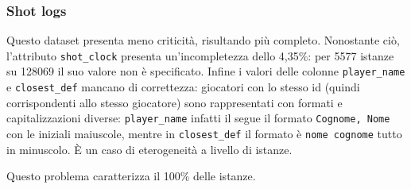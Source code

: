 \subsubsection{Shot logs}

Questo dataset presenta meno criticità, risultando più completo. Nonostante ciò, l’attributo \texttt{shot\_clock} presenta un’incompletezza dello 4,35\%: per 5577 istanze su 128069 il suo valore non è specificato.
Infine i valori delle colonne \texttt{player\_name} e \texttt{closest\_def} mancano di correttezza: giocatori con lo stesso id (quindi corrispondenti allo stesso giocatore) sono rappresentati con formati e capitalizzazioni diverse: \texttt{player\_name} infatti il segue il formato \texttt{Cognome, Nome} con le iniziali maiuscole, mentre in \texttt{closest\_def} il formato è \texttt{nome cognome} tutto in minuscolo. È un caso di eterogeneità a livello di istanze.

\par
Questo problema caratterizza il 100\% delle istanze.
